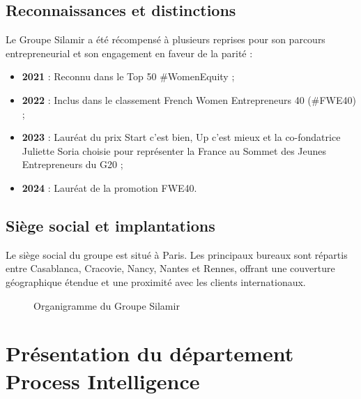 \subsection{Reconnaissances et distinctions}

Le Groupe Silamir a été récompensé à plusieurs reprises pour son parcours entrepreneurial et son engagement en faveur de la parité :

\begin{itemize}
    \item \textbf{2021} : Reconnu dans le Top 50 \#WomenEquity ;
    \item \textbf{2022} : Inclus dans le classement French Women Entrepreneurs 40 (\#FWE40) ;
    \item \textbf{2023} : Lauréat du prix \og Start c'est bien, Up c'est mieux \fg{} et la co-fondatrice Juliette Soria choisie pour représenter la France au Sommet des Jeunes Entrepreneurs du G20 ;
    \item \textbf{2024} : Lauréat de la promotion FWE40.
\end{itemize}

\subsection{Siège social et implantations}

Le siège social du groupe est situé à Paris. Les principaux bureaux sont répartis entre Casablanca, Cracovie, Nancy, Nantes et Rennes, offrant une couverture géographique étendue et une proximité avec les clients internationaux.

\begin{figure}[htbp]
    \centering
    \caption{Organigramme du Groupe Silamir}
    \label{fig:organigramme}
\end{figure}

\section{Présentation du département Process Intelligence}

